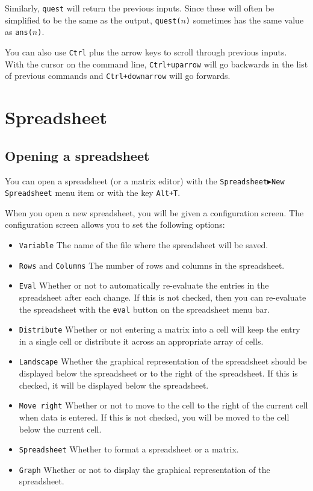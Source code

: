 \documentclass[a4paper,11pt]{book}
\begin{document}
Similarly, \texttt{quest} will return the previous inputs.  Since
these will often be simplified to be the same as the output,
\texttt{quest($n$)} sometimes has the same value as \texttt{ans($n$)}.

You can also use \texttt{Ctrl} plus the arrow keys to scroll through
previous inputs.  With the cursor on the command line,
\texttt{Ctrl+uparrow} will go backwards in the list of previous
commands and \texttt{Ctrl+downarrow} will go forwards.

\section{Spreadsheet}

\subsection{Opening a spreadsheet}

You can open a spreadsheet (or a matrix editor) with the
\texttt{Spreadsheet$\blacktriangleright$New Spreadsheet} menu item or
with the key \texttt{Alt+T}. 

When you open a new spreadsheet, you will be given a configuration screen.  
The configuration screen allows you to set the following options:
\begin{itemize}
  \item
  \texttt{Variable}
  The name of the file where the spreadsheet will be
  saved.
  \item
  \texttt{Rows} and \texttt{Columns}
  The number of rows and columns in the spreadsheet.  
  \item
  \texttt{Eval}
  Whether or not to automatically re-evaluate the entries in the
  spreadsheet after each change.  If this is not checked, then you can
  re-evaluate the spreadsheet with the \texttt{eval} button on the
  spreadsheet menu bar.
  \item
  \texttt{Distribute}
  Whether or not entering a matrix into a cell will keep the entry in
  a single cell or distribute it across an appropriate array of cells.
  \item
  \texttt{Landscape}
  Whether the graphical representation of the spreadsheet should be
  displayed below the spreadsheet or to the right of the spreadsheet.
  If this is checked, it will be displayed below the spreadsheet.
  \item
  \texttt{Move right}
  Whether or not to move to the cell to the right of the current cell
  when data is entered.  If this is not checked, you will be moved to
  the cell below the current cell.
  \item
  \texttt{Spreadsheet}
  Whether to format a spreadsheet or a matrix.
  \item
  \texttt{Graph}
  Whether or not to display the graphical representation of the
  spreadsheet. 
\end{itemize}
\end{document}
